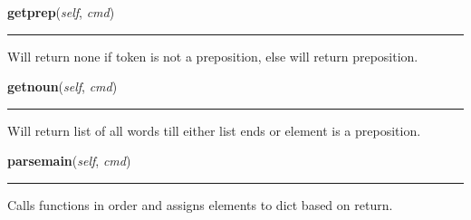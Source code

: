     \label{Lib:mudParser:mudparse:getprep}

    \vspace{0.5ex}

    \begin{boxedminipage}{\textwidth}

    \raggedright \textbf{getprep}(\textit{self}, \textit{cmd})

    \vspace{-1.5ex}

    \rule{\textwidth}{0.5\fboxrule}
    Will return none if token is not a preposition, else will return 
    preposition.

    \vspace{1ex}

    \end{boxedminipage}

    \label{Lib:mudParser:mudparse:getnoun}

    \vspace{0.5ex}

    \begin{boxedminipage}{\textwidth}

    \raggedright \textbf{getnoun}(\textit{self}, \textit{cmd})

    \vspace{-1.5ex}

    \rule{\textwidth}{0.5\fboxrule}
    Will return list of all words till either list ends or element is a 
    preposition.

    \vspace{1ex}

    \end{boxedminipage}

    \label{Lib:mudParser:mudparse:parsemain}

    \vspace{0.5ex}

    \begin{boxedminipage}{\textwidth}

    \raggedright \textbf{parsemain}(\textit{self}, \textit{cmd})

    \vspace{-1.5ex}

    \rule{\textwidth}{0.5\fboxrule}
    Calls functions in order and assigns elements to dict based on return.

    \vspace{1ex}

    \end{boxedminipage}

